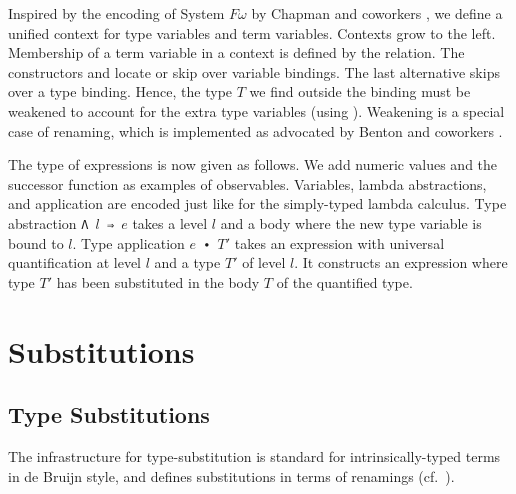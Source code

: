 \documentclass[acmsmall,anonymous,review,screen]{acmart}
\begin{document}
Inspired by the encoding of System $F\omega$ by Chapman and coworkers
\cite{DBLP:conf/mpc/ChapmanKNW19}, we define a 
unified context for type variables and term variables. Contexts grow to the left.
\TFTVEnv
Membership of a term variable in a context is defined by the
{\Ainn} relation.
\TFinn
The constructors {\Ahere} and {\Athere} locate or skip over variable bindings.
The last alternative {\Atskip} skips over a type binding. Hence, the type
$T$ we find outside the binding must be weakened to account for the
extra type variables (using {\ATwk}). Weakening is a special case of renaming, which
is implemented as advocated by Benton and coworkers \cite{DBLP:journals/jar/BentonHKM12}.

The type of expressions is now given as follows.
\TFExpr
We add numeric values and the successor function as examples of observables.
Variables, lambda abstractions, and application are encoded just like
for the simply-typed lambda calculus.
Type abstraction \texttt{Λ $l$ ⇒ $e$} takes a level $l$ and a body where the new type
variable is bound to $l$. 
Type application \texttt{$e$ ∙ $T'$} takes an expression with universal quantification at
level $l$ and a type $T'$ of level $l$. It constructs an expression
where type $T'$ has been substituted in the body $T$ of the
quantified type.

\section{Substitutions}
\label{sec:substitutions}

\subsection{Type Substitutions}
\label{sec:substitutions:type}

The infrastructure for type-substitution is standard for
intrinsically-typed terms in de Bruijn
style, and defines substitutions in terms of renamings
(cf.~\cite{DBLP:journals/jar/BentonHKM12, DBLP:journals/scp/KokkeSW20}).


\end{document}

